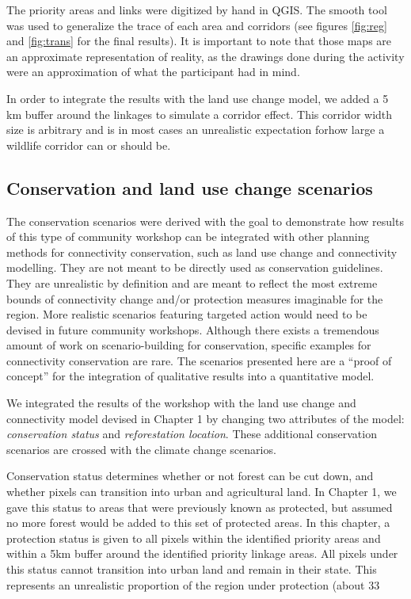 The priority areas and links were digitized by hand in QGIS. The smooth tool was used to generalize the trace of each area and corridors (see figures \ref{fig:reg}  and \ref{fig:trans} for the final results). It is important to note that those maps are an approximate representation of reality, as the drawings done during the activity were an approximation of what the participant had in mind.

In order to integrate the results with the land use change model, we added a 5 km buffer around the linkages to simulate a corridor effect. This corridor width size is arbitrary and is in most cases  an unrealistic expectation forhow large a wildlife corridor can or should be. \\

\subsection{Conservation and land use change scenarios}

The conservation scenarios were derived with the goal to demonstrate how results of this type of community workshop can be integrated with other planning methods for connectivity conservation, such as land use change and connectivity modelling. They are not meant to be directly used as conservation guidelines. They are unrealistic by definition and are meant to reflect the most extreme bounds of connectivity change and/or protection measures imaginable for the region. More realistic scenarios featuring targeted action would need to be devised in future community workshops. Although there exists a tremendous amount of work on scenario-building for conservation, specific examples for connectivity conservation are rare. The scenarios presented here are a “proof of concept” for the integration of qualitative results into a quantitative model. 

We integrated the results of the workshop with the land use change and connectivity model devised in Chapter 1 by changing two attributes of the model: \textit{conservation status} and \textit{reforestation location}. These additional conservation scenarios are crossed with the climate change scenarios.

Conservation status determines whether or not forest can be cut down, and whether pixels can transition into urban and agricultural land. In Chapter 1, we gave this status to areas that were previously known as protected, but assumed no more forest would be added to this set of protected areas. In this chapter, a protection status is given to all pixels within the identified priority areas and within a 5km buffer around the identified priority linkage areas. All pixels under this status cannot transition into urban land and remain in their state. This represents an unrealistic proportion of the region under protection (about 33%

